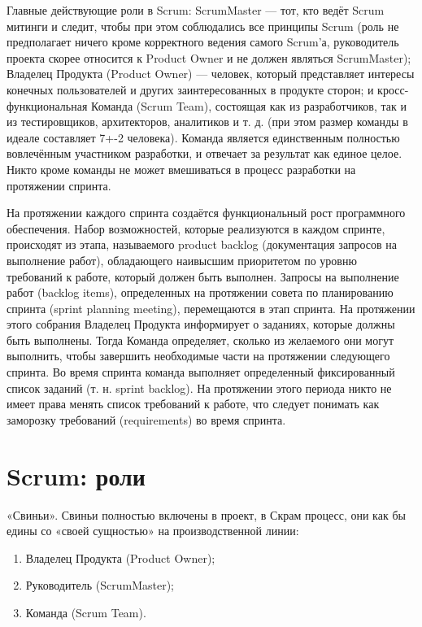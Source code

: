 \documentclass{article}
\begin{document}
    Главные действующие роли в Scrum: ScrumMaster — тот, кто ведёт Scrum митинги и следит, чтобы при этом соблюдались все принципы Scrum (роль не предполагает ничего кроме корректного ведения самого Scrum'а, руководитель проекта скорее относится к Product Owner и не должен являться ScrumMaster); Владелец Продукта (Product Owner) — человек, который представляет интересы конечных пользователей и других заинтересованных в продукте сторон; и кросс-функциональная Команда (Scrum Team), состоящая как из разработчиков, так и из тестировщиков, архитекторов, аналитиков и т. д. (при этом размер команды в идеале составляет 7+-2 человека). Команда является единственным полностью вовлечённым участником разработки, и отвечает за результат как единое целое. Никто кроме команды не может вмешиваться в процесс разработки на протяжении спринта.

    На протяжении каждого спринта создаётся функциональный рост программного обеспечения. Набор возможностей, которые реализуются в каждом спринте, происходят из этапа, называемого product backlog (документация запросов на выполнение работ), обладающего наивысшим приоритетом по уровню требований к работе, который должен быть выполнен. Запросы на выполнение работ (backlog items), определенных на протяжении совета по планированию спринта (sprint planning meeting), перемещаются в этап спринта. На протяжении этого собрания Владелец Продукта информирует о заданиях, которые должны быть выполнены. Тогда Команда определяет, сколько из желаемого они могут выполнить, чтобы завершить необходимые части на протяжении следующего спринта. Во время спринта команда выполняет определенный фиксированный список заданий (т. н. sprint backlog). На протяжении этого периода никто не имеет права менять список требований к работе, что следует понимать как заморозку требований (requirements) во время спринта.

\section{Scrum: роли}
    «Свиньи». Свиньи полностью включены в проект, в Скрам процесс, они как бы едины со «своей сущностью» на производственной линии:
    \begin{enumerate}
        \item Владелец Продукта (Product Owner);
        \item Руководитель (ScrumMaster);
        \item Команда (Scrum Team).
    \end{enumerate}
\end{document}
